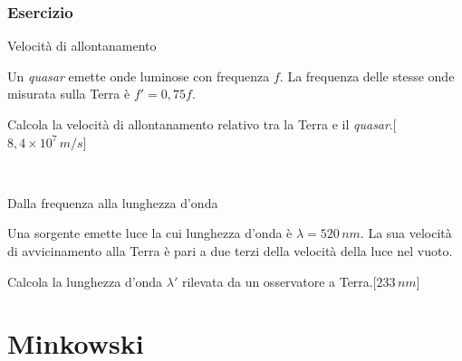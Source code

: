 \documentclass[]{beamer}
\theoremstyle{plain}
\begin{document}
\begin{frame}
\frametitle{Esercizio}
\begin{exampleblock}{Velocità di allontanamento}
\small{
  Un \emph{quasar} emette onde luminose con frequenza $ f $. La frequenza delle stesse onde misurata sulla Terra è $ f' = 0,75f $.

  Calcola la velocità di allontanamento relativo tra la Terra e il \emph{quasar}.\hspace*{\fill}[$ 8,4 \times 10^{7} \, m/s $]
  }
\end{exampleblock}

~

\begin{exampleblock}{Dalla frequenza alla lunghezza d'onda}
\small{
  Una sorgente emette luce la cui lunghezza d'onda è $ \lambda = 520 \, nm $. La sua velocità di avvicinamento alla Terra è pari a due terzi della velocità della luce nel vuoto.

  Calcola la lunghezza d'onda $ \lambda' $ rilevata da un osservatore a Terra.\hspace*{\fill}[$ 233 \, nm $]
  }
\end{exampleblock}
\end{frame}




\section{Minkowski}
\end{document}
